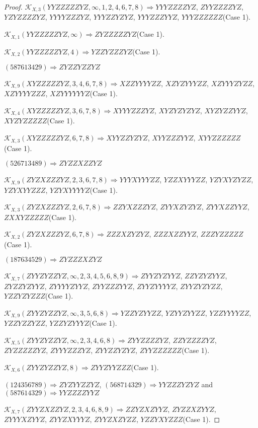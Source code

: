 \documentclass[12pt]{article}
\theoremstyle{plain}
\theoremstyle{definition}
\theoremstyle{remark}
\newcommand{\fancy}[1]{\mathcal{#1}}
\def\K{\fancy{K}}
\begin{document}
\begin{proof}
	$\K_{X,3}(YYZZZZZYZ,\infty,1, 2, 4, 6, 7, 8)\Rightarrow $$YYYZZZZYZ$, $ZYYZZZZYZ$, $YZYZZZZYZ$, $YYYYZZZYZ$, $YYYZZYZYZ$, $YYYZZZYYZ$, $YYYZZZZZZ$(Case 1).
	
	$\K_{X,1}(YYZZZZZYZ,\infty)\Rightarrow $$ZYZZZZZYZ$(Case 1).
	
	$\K_{X,2}(YYZZZZZYZ,4)\Rightarrow $$YZZYZZZYZ$(Case 1).
	
	
	
	$(5 8 7 6 1 3 4 2 9)\Rightarrow ZYZZYZZYZ$
	
	
	$\K_{X,9}(XYZZZZZYZ,3, 4, 6, 7, 8)\Rightarrow $$XZZYYYYZZ$, $XZYZYYYZZ$, $XZYYYZYZZ$, $XZYYYYZZZ$, $XZYYYYYYZ$(Case 1).
	
	$\K_{X,4}(XYZZZZZYZ,3, 6, 7, 8)\Rightarrow $$XYYYZZZYZ$, $XYZYZYZYZ$, $XYZYZZYYZ$, $XYZYZZZZZ$(Case 1).
	
	$\K_{X,3}(XYZZZZZYZ,6, 7, 8)\Rightarrow $$XYYZZYZYZ$, $XYYZZZYYZ$, $XYYZZZZZZ$(Case 1).
	
	
	
	$(5 2 6 7 1 3 4 8 9)\Rightarrow ZYZZXZZYZ$
	
	
	$\K_{X,9}(ZYZXZZZYZ,2, 3, 6, 7, 8)\Rightarrow $$YYYXYYYZZ$, $YZZXYYYZZ$, $YZYXYZYZZ$, $YZYXYYZZZ$, $YZYXYYYYZ$(Case 1).
	
	$\K_{X,3}(ZYZXZZZYZ,2, 6, 7, 8)\Rightarrow $$ZZYXZZZYZ$, $ZYYXZYZYZ$, $ZYYXZZYYZ$, $ZXXYZZZZZ$(Case 1).
	
	$\K_{X,2}(ZYZXZZZYZ,6, 7, 8)\Rightarrow $$ZZZXZYZYZ$, $ZZZXZZYYZ$, $ZZZYZZZZZ$(Case 1).
	
	
	
	$(1 8 7 6 3 4 5 2 9)\Rightarrow ZYZZZXZYZ$
	
	
	$\K_{X,7}(ZYYZYZZYZ,\infty,2, 3, 4, 5, 6, 8, 9)\Rightarrow $$ZYYZYZYYZ$, $ZZYZYZYYZ$, $ZYZZYZYYZ$, $ZYYYYZYYZ$, $ZYYZZZYYZ$, $ZYYZYYYYZ$, $ZYYZYZYZZ$, $YZZYZYZZZ$(Case 1).
	
	$\K_{X,9}(ZYYZYZZYZ,\infty,3, 5, 6, 8)\Rightarrow $$YZZYZYYZZ$, $YZYYZYYZZ$, $YZZYYYYZZ$, $YZZYZZYZZ$, $YZZYZYYYZ$(Case 1).
	
	$\K_{X,5}(ZYYZYZZYZ,\infty,2, 3, 4, 6, 8)\Rightarrow $$ZYYZZZZYZ$, $ZZYZZZZYZ$, $ZYZZZZZYZ$, $ZYYYZZZYZ$, $ZYYZZYZYZ$, $ZYYZZZZZZ$(Case 1).
	
	$\K_{X,6}(ZYYZYZZYZ,8)\Rightarrow $$ZYYZYYZZZ$(Case 1).
	
	
	
	$(1 2 4 3 5 6 7 8 9)\Rightarrow ZYZYYZZYZ$, $(5 6 8 7 1 4 3 2 9)\Rightarrow YYZZZYZYZ$ and $(5 8 7 6 1 4 3 2 9)\Rightarrow YYZZZZYYZ$
	
	
	$\K_{X,7}(ZYYZXZZYZ,2, 3, 4, 6, 8, 9)\Rightarrow $$ZZYZXZYYZ$, $ZYZZXZYYZ$, $ZYYYXZYYZ$, $ZYYZXYYYZ$, $ZYYZXZYZZ$, $YZZYXYZZZ$(Case 1).
	

\end{proof}
\end{document}
